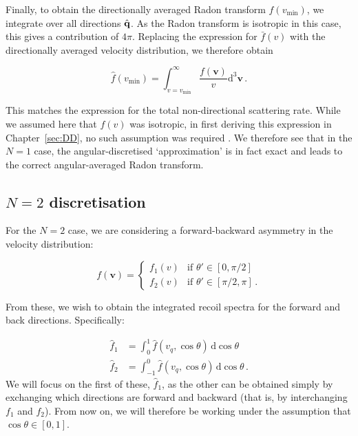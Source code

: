 Finally, to obtain the directionally averaged Radon transform $\hat{f}(v_\textrm{min})$, we integrate over all directions $\hat{\textbf{q}}$. As the Radon transform is isotropic in this case, this gives a contribution of $4\pi$. Replacing the expression for $\bar{f}(v)$ with the directionally averaged velocity distribution, we therefore obtain 

\begin{equation}
\hat{f}\left(v_\textrm{min}\right) = \int_{v=v_\textrm{min}}^\infty \frac{f(\textbf{v})}{v} \mathrm{d}^3\textbf{v}\,.
\end{equation}

This matches the expression for the total non-directional scattering rate. While we assumed here that $f(v)$ was isotropic, in first deriving this expression in Chapter~\ref{sec:DD}, no such assumption was required . We therefore see that in the $N=1$ case, the angular-discretised `approximation' is in fact exact and leads to the correct angular-averaged Radon transform.

\subsection{$N=2$ discretisation}

For the $N=2$ case, we are considering a forward-backward asymmetry in the velocity distribution:

\begin{equation}
\label{eq:directional:N2}
f(\mathbf{v}) =
\begin{cases}
f_1(v) & \textrm{if } \theta' \in [0, \pi/2] \\
f_2(v) & \textrm{if } \theta' \in [\pi/2, \pi]\,.
\end{cases}
\end{equation}

From these, we wish to obtain the integrated recoil spectra for the forward and back directions. Specifically:

\begin{align}
\hat{f}_1 &= \int_{0}^1 \hat{f}(v_q,\cos\theta) \, \mathrm{d}\cos\theta \\
\hat{f}_2 &= \int_{-1}^0 \hat{f}(v_q, \cos\theta) \, \mathrm{d}\cos\theta \,.
\end{align}
We will focus on the first of these, $\hat{f}_1$, as the other can be obtained simply by exchanging which directions are forward and backward (that is, by interchanging $f_1$ and $f_2$). From now on, we will therefore be working under the assumption that $\cos\theta \in [0,1]$.


